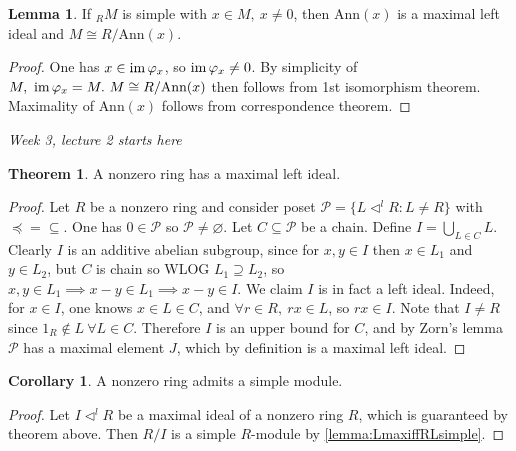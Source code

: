 \documentclass[a4paper]{article}
\newcommand{\Ann}{\text{Ann}}
\newcommand{\im}{\text{im\,}}
\theoremstyle{definition}
\newtheorem{thm}[defn]{Theorem}
\newtheorem{lemma}[defn]{Lemma}
\newtheorem{coro}[defn]{Corollary}
\begin{document}
\begin{lemma}
\label{lemma:MisoRAnnx}
If $_RM$ is simple with $x\in M,\ x\neq 0$, then $\Ann(x)$ is a maximal left ideal and $M\cong R/\Ann(x)$.
\end{lemma}
\begin{proof}
One has $x\in \im\varphi_x$, so $\im\varphi_x\neq 0$. By simplicity of $M,\ \im\varphi_x=M.\ M\cong R/\Ann(x)$ then follows from 1st isomorphism theorem. Maximality of $\Ann(x)$ follows from correspondence theorem.
\end{proof}

\begin{flushright}
\textit{Week 3, lecture 2 starts here}
\end{flushright}

\begin{thm}
\label{thm:n0ringshavemaxleftideal}
A nonzero ring has a maximal left ideal.
\end{thm}
\begin{proof}
Let $R$ be a nonzero ring and consider poset $\mathcal P=\{L\lhd^l R:L\neq R\}$ with $\preceq{}={}\subseteq$. One has $0\in\mathcal P$ so $\mathcal P\neq\varnothing$. Let $C\subseteq\mathcal P$ be a chain. Define $I=\bigcup_{L\in C}L$. Clearly $I$ is an additive abelian subgroup, since for $x,y\in I$ then $x\in L_1$ and $y\in L_2$, but $C$ is chain so WLOG $L_1\supseteq L_2$, so $x,y\in L_1\implies x-y\in L_1\implies x-y\in I$. We claim $I$ is in fact a left ideal. Indeed, for $x\in I$, one knows $x\in L\in C$, and $\forall r\in R,\ rx\in L$, so $rx\in I$. Note that $I\neq R$ since $1_R\notin L \ \forall L\in C$. Therefore $I$ is an upper bound for $C$, and by Zorn's lemma $\mathcal P$ has a maximal element $J$, which by definition is a maximal left ideal.
\end{proof}

\begin{coro}
\label{coro:non0ringsadmitsimpmod}
A nonzero ring admits a simple module.
\end{coro}
\begin{proof}
Let $I\lhd^l R$ be a maximal ideal of a nonzero ring $R$, which is guaranteed by theorem above. Then $R/I$ is a simple $R$-module by \ref{lemma:LmaxiffRLsimple}.
\end{proof}
\end{document}
